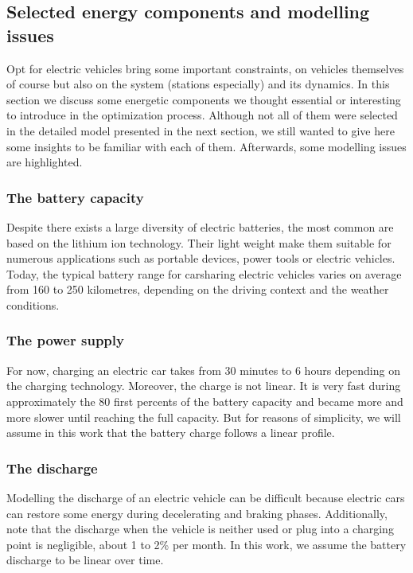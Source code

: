 \begin{bibunit}[ieeetr]


\subsection{Selected energy components and modelling issues}
Opt for electric vehicles bring some important constraints, on vehicles themselves of course but also on the system (stations especially) and its dynamics.
In this section we discuss some energetic components we thought essential or interesting to introduce in the optimization process.
Although not all of them were selected in the detailed model presented in the next section, we still wanted to give here some insights to be familiar with each of them.
Afterwards, some modelling issues are highlighted.

\subsubsection{The battery capacity}
Despite there exists a large diversity of electric batteries, the most common are based on the lithium ion technology.
Their light weight make them suitable for numerous applications such as portable devices, power tools or electric vehicles.
Today, the typical battery range for carsharing electric vehicles varies on average from 160 to 250 kilometres, depending on the driving context and the weather conditions.

\subsubsection{The power supply}
For now, charging an electric car takes from 30 minutes to 6 hours depending on the charging technology.
Moreover, the charge is not linear.
It is very fast during approximately the 80 first percents of the battery capacity and became more and more slower until reaching the full capacity.
But for reasons of simplicity, we will assume in this work that the battery charge follows a linear profile.


\subsubsection{The discharge}
Modelling the discharge of an electric vehicle can be difficult because electric cars can restore some energy during decelerating and braking phases.
Additionally, note that the discharge when the vehicle is neither used or plug into a charging point is negligible, about 1 to 2\% per month.
In this work, we assume the battery discharge to be linear over time.


\end{bibunit}
